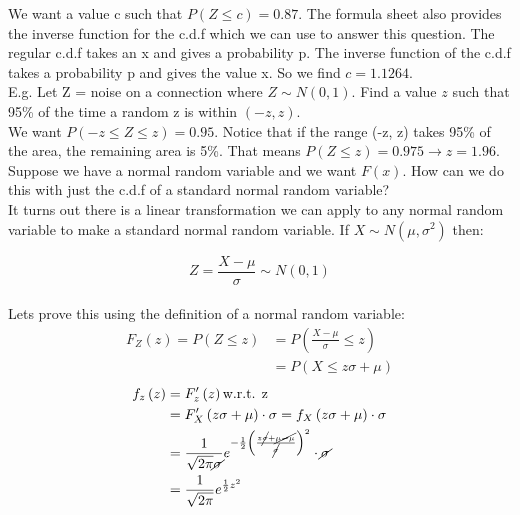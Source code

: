 \documentclass[12pt, letterpaper]{article}
\begin{document}
We want a value c such that \(P\left(Z \leq c\right) = 0.87\). The formula sheet also provides the inverse function for the c.d.f which we can use to answer this question. The regular c.d.f takes an x and gives a probability p. The inverse function of the c.d.f takes a probability p and gives the value x. So we find \(c = 1.1264\).\\

E.g. Let Z = noise on a connection where \(Z \sim N(0, 1)\). Find a value \(z\) such that 95\% of the time a random z is within \((-z, z)\).\\

We want \(P\left(-z \leq Z \leq z\right) = 0.95\). Notice that if the range (-z, z) takes 95\% of the area, the remaining area is 5\%. That means \(P\left(Z \leq z\right) = 0.975 \rightarrow z = 1.96\).\\

Suppose we have a normal random variable and we want \(F\left(x\right)\). How can we do this with just the c.d.f of a standard normal random variable?\\

It turns out there is a linear transformation we can apply to any normal random variable to make a standard normal random variable. If \(X \sim N(\mu, \sigma^2)\) then:

\begin{equation}
Z = \frac{X - \mu}{\sigma} \sim N(0, 1)
\end{equation}\\

Lets prove this using the definition of a normal random variable:
\begin{align*}
F_Z\left(z\right) = P\left(Z \leq z\right) &= P\left(\frac{X - \mu}{\sigma} \leq z\right)\\
&= P\left(X \leq z\sigma + \mu\right)
\end{align*}
\begin{align*}
f_z\left(z\right) &= F_z'\left(z\right) \text{w.r.t. z}\\
&= F_X '\left(z\sigma + \mu\right) \cdot \sigma = f_X \left(z\sigma + \mu\right) \cdot \sigma\\
&= \frac{1}{\sqrt{2\pi} \cancel{\sigma}} e^{-\frac{1}{2} \left(\frac{z\cancel{\sigma} + \cancel{\mu - \mu}}{\cancel{\sigma}}\right)^2} \cdot \cancel{\sigma}\\
&= \frac{1}{\sqrt{2\pi}} e^{\frac{1}{2} z^2}
\end{align*}\\
\end{document}
